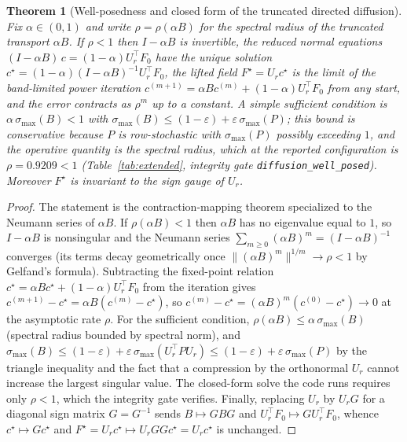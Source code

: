 \documentclass[aps,prresearch,reprint,amsmath,amssymb,nofootinbib,superscriptaddress,floatfix]{revtex4-2}
\newtheorem{theorem}{Theorem}
\theoremstyle{definition}
\theoremstyle{remark}
\theoremstyle{plain}
\begin{document}
\begin{theorem}[Well-posedness and closed form of the truncated directed diffusion]
\label{thm:fixedpoint}
Fix $\alpha\in(0,1)$ and write $\rho=\rho(\alpha B)$ for the spectral radius of the truncated transport
$\alpha B$. If $\rho<1$ then $I-\alpha B$ is invertible, the reduced normal equations
$(I-\alpha B)\,c=(1-\alpha)U_r^\top F_0$ have the unique solution
$c^\star=(1-\alpha)(I-\alpha B)^{-1}U_r^\top F_0$, the lifted field $F^\star=U_rc^\star$ is the limit of
the band-limited power iteration $c^{(m+1)}=\alpha Bc^{(m)}+(1-\alpha)U_r^\top F_0$ from any start, and the
error contracts as $\rho^{m}$ up to a constant. A simple sufficient condition is
$\alpha\,\sigma_{\max}(B)<1$ with $\sigma_{\max}(B)\le(1-\varepsilon)+\varepsilon\,\sigma_{\max}(P)$; this
bound is conservative because $P$ is row-stochastic with $\sigma_{\max}(P)$ possibly exceeding $1$, and the
operative quantity is the spectral radius, which at the reported configuration is $\rho=\num{0.9209}<1$
(Table~\ref{tab:extended}, integrity gate \texttt{diffusion\_well\_posed}). Moreover $F^\star$ is invariant
to the sign gauge of $U_r$.
\end{theorem}
\begin{proof}
The statement is the contraction-mapping theorem specialized to the Neumann series of $\alpha B$. If
$\rho(\alpha B)<1$ then $\alpha B$ has no eigenvalue equal to $1$, so $I-\alpha B$ is nonsingular and the
Neumann series $\sum_{m\ge0}(\alpha B)^m=(I-\alpha B)^{-1}$ converges (its terms decay geometrically once
$\|(\alpha B)^m\|^{1/m}\to\rho<1$ by Gelfand's formula). Subtracting the fixed-point relation
$c^\star=\alpha Bc^\star+(1-\alpha)U_r^\top F_0$ from the iteration gives
$c^{(m+1)}-c^\star=\alpha B(c^{(m)}-c^\star)$, so $c^{(m)}-c^\star=(\alpha B)^m(c^{(0)}-c^\star)\to0$ at the
asymptotic rate $\rho$. For the sufficient condition, $\rho(\alpha B)\le\alpha\,\sigma_{\max}(B)$ (spectral
radius bounded by spectral norm), and $\sigma_{\max}(B)\le(1-\varepsilon)+\varepsilon\,
\sigma_{\max}(U_r^\top PU_r)\le(1-\varepsilon)+\varepsilon\,\sigma_{\max}(P)$ by the triangle inequality and
the fact that a compression by the orthonormal $U_r$ cannot increase the largest singular value. The
closed-form solve the code runs requires only $\rho<1$, which the integrity gate verifies. Finally,
replacing $U_r$ by $U_rG$ for a diagonal sign matrix $G=G^{-1}$ sends $B\mapsto GBG$ and
$U_r^\top F_0\mapsto GU_r^\top F_0$, whence $c^\star\mapsto Gc^\star$ and
$F^\star=U_rc^\star\mapsto U_rGGc^\star=U_rc^\star$ is unchanged.
\end{proof}
\end{document}
